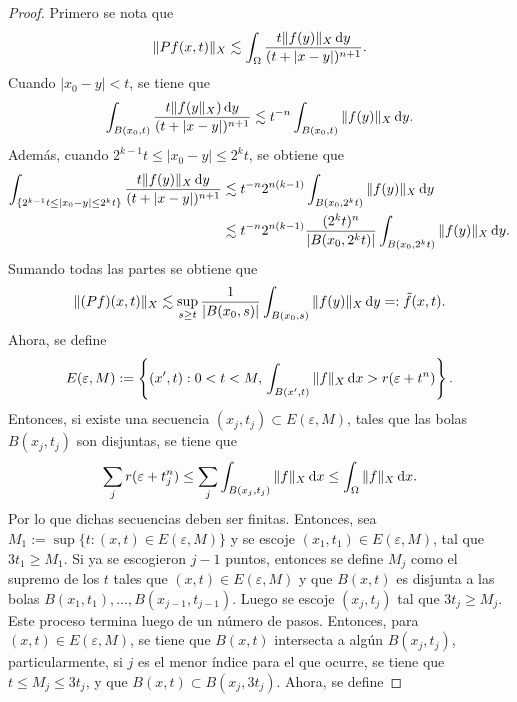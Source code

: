 \begin{proof}
	Primero se nota que 
	\begin{equation*}
		\|Pf(x, t)\|_X \lesssim \int_{\Omega} \frac{t\|f(y)\|_X\mathop{}\!\mathrm{d} y}{(t + |x-y|)^{n+1}}.
	\end{equation*}
	Cuando $|x_0-y|<t$, se tiene que
	\begin{equation*}
		\int_{B(x_0, t)} \frac{t\|f(y\|_X)\mathop{}\!\mathrm{d} y}{(t + |x-y|)^{n+1}} \lesssim t^{-n}  \int_{B(x_0, t)}  \|f(y)\|_X\mathop{}\!\mathrm{d} y.
	\end{equation*}
	Además, cuando $2^{k-1}t \leq |x_0-y|\leq 2^kt$, se obtiene que
	\begin{align*}
		\int_{\{2^{k-1}t \leq |x_0-y|\leq 2^kt\}} \frac{t\|f(y)\|_X\mathop{}\!\mathrm{d} y}{(t + |x-y|)^{n+1}}& \lesssim t^{-n}2^{n(k-1)}  \int_{B(x_0, 2^kt)}\| f(y)\|_X\mathop{}\!\mathrm{d} y \\
		& \lesssim t^{-n}2^{n(k-1)} \frac{(2^kt)^{n}}{|B(x_0, 2^kt)|} \int_{B(x_0, 2^kt)}  \|f(y)\|_X\mathop{}\!\mathrm{d} y.
	\end{align*}
	Sumando todas las partes se obtiene que 
	\begin{equation*}
		\|(Pf)(x, t)\|_X \lesssim \sup_{s\geq t}  \frac{1}{|B(x_0, s)|}\int_{B(x_0, s)}\|f(y)\|_X \mathop{}\!\mathrm{d} y =: \tilde{f}(x, t).
	\end{equation*}
	Ahora, se define 
	\begin{equation*}
		E(\varepsilon, M) := \left\{ (x', t) : 0<t<M, \, \int_{B(x', t)} \|f\|_X\mathop{}\!\mathrm{d} x > r(\varepsilon + t^n) \right\}.
	\end{equation*}
	Entonces, si existe una secuencia $(x_j, t_j) \subset E(\varepsilon, M)$, tales que las bolas $B(x_j, t_j)$ son disjuntas, se tiene que
	\begin{equation*}
		\sum_j r(\varepsilon + t_j^n) \leq \sum_j \int_{B(x_j, t_j)} \|f\|_X \mathop{}\!\mathrm{d} x\leq \int_{\Omega} \|f\|_X \mathop{}\!\mathrm{d} x.
	\end{equation*} 
	Por lo que dichas secuencias deben ser finitas. Entonces, sea $M_1 := \sup\{t:(x, t)\in E(\varepsilon, M)\}$ y se escoje $(x_1, t_1)\in E(\varepsilon, M)$, tal que $3t_1 \geq M_1$. Si ya se escogieron $j-1$ puntos, entonces se define $M_j$ como el supremo de los $t$ tales que $(x, t)\in E(\varepsilon, M)$ y que $B(x, t)$ es disjunta a las bolas $B(x_1, t_1),\ldots,B(x_{j-1}, t_{j-1})$. Luego se escoje $(x_j, t_j)$ tal que $3t_j \geq M_j$. Este proceso termina luego de un número de pasos. Entonces, para $(x, t)\in E(\varepsilon, M)$, se tiene que $B(x, t)$ intersecta a algún $B(x_j, t_j)$, particularmente, si $j$ es el menor índice para el que ocurre, se tiene que $t\leq M_j \leq 3t_j$, y que $B(x, t) \subset B(x_j, 3t_j)$. Ahora, se define

\end{proof}
